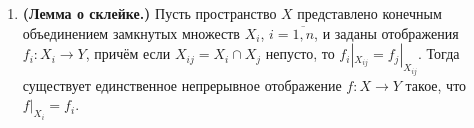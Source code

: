 \documentclass[a4paper]{article}
\begin{document}
\begin{enumerate}
\item \textbf{(Лемма о склейке.)} Пусть пространство $X$ представлено конечным объединением замкнутых множеств $X_i$, $i=\overline{1,n}$, и заданы отображения $f_i\colon X_i\to Y$, причём если $X_{ij}=X_i\cap X_j$ непусто, то $f_i|_{X_{ij}}=f_j|_{X_{ij}}$. Тогда существует единственное непрерывное отображение $f\colon X\to Y$ такое, что $f|_{X_i}=f_i$.

\end{enumerate}
\end{document}
